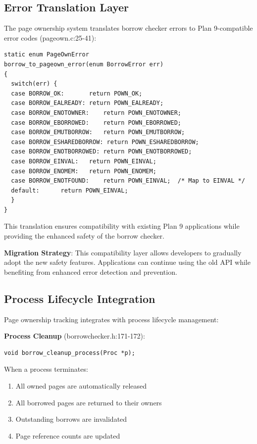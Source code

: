 \documentclass[11pt,letterpaper]{article}
\begin{document}
\subsection{Error Translation Layer}

The page ownership system translates borrow checker errors to Plan 9-compatible error codes (pageown.c:25-41):

\begin{lstlisting}
static enum PageOwnError
borrow_to_pageown_error(enum BorrowError err)
{
  switch(err) {
  case BORROW_OK:		return POWN_OK;
  case BORROW_EALREADY:	return POWN_EALREADY;
  case BORROW_ENOTOWNER:	return POWN_ENOTOWNER;
  case BORROW_EBORROWED:	return POWN_EBORROWED;
  case BORROW_EMUTBORROW:	return POWN_EMUTBORROW;
  case BORROW_ESHAREDBORROW: return POWN_ESHAREDBORROW;
  case BORROW_ENOTBORROWED: return POWN_ENOTBORROWED;
  case BORROW_EINVAL:	return POWN_EINVAL;
  case BORROW_ENOMEM:	return POWN_ENOMEM;
  case BORROW_ENOTFOUND:	return POWN_EINVAL;  /* Map to EINVAL */
  default:		return POWN_EINVAL;
  }
}
\end{lstlisting}

This translation ensures compatibility with existing Plan 9 applications while providing the enhanced safety of the borrow checker.

\textbf{Migration Strategy}: This compatibility layer allows developers to gradually adopt the new safety features. Applications can continue using the old API while benefiting from enhanced error detection and prevention.

\subsection{Process Lifecycle Integration}

Page ownership tracking integrates with process lifecycle management:

\textbf{Process Cleanup} (borrowchecker.h:171-172):

\begin{lstlisting}
void borrow_cleanup_process(Proc *p);
\end{lstlisting}

When a process terminates:
\begin{enumerate}
\item All owned pages are automatically released
\item All borrowed pages are returned to their owners
\item Outstanding borrows are invalidated
\item Page reference counts are updated
\end{enumerate}
\end{document}
